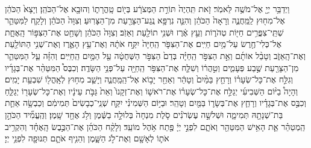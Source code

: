 \documentclass[twoside, openany, parskip=half, 11pt]{book}
\begin{document}
\begin{footnotesize}
\begin{multicols}{2}
\\
 וַיְדַבֵּ֥ר יְיָ֖ אֶל־מֹשֶׁ֥ה לֵּאמֹֽר׃ זֹ֤את תִּֽהְיֶה֙ תּוֹרַ֣ת הַמְּצֹרָ֔ע בְּי֖וֹם טָֽהֳרָת֑וֹ וְהוּבָ֖א אֶל־הַכֹּהֵֽן׃ וְיָצָא֙ הַכֹּהֵ֔ן אֶל־מִח֖וּץ לַֽמַּֽחֲנֶ֑ה וְרָאָה֙ הַכֹּהֵ֔ן וְהִנֵּ֛ה נִרְפָּ֥א נֶֽגַע־הַצָּרַ֖עַת מִן־הַצָּרֽוּעַ׃ וְצִוָּה֙ הַכֹּהֵ֔ן וְלָקַ֧ח לַמִּטַּהֵ֛ר שְׁתֵּֽי־צִפֳּרִ֥ים חַיּ֖וֹת טְהֹר֑וֹת וְעֵ֣ץ אֶ֔רֶז וּשְׁנִ֥י תוֹלַ֖עַת וְאֵזֹֽב׃ וְצִוָּה֙ הַכֹּהֵ֔ן וְשָׁחַ֖ט אֶת־הַצִּפּ֣וֹר הָֽאֶחָ֑ת אֶל־כְּלִי־חֶ֖רֶשׂ עַל־מַ֥יִם חַיִּֽים׃  אֶת־הַצִּפֹּ֤ר הַֽחַיָּה֙ יִקַּ֣ח אֹתָ֔הּ וְאֶת־עֵ֥ץ הָאֶ֛רֶז וְאֶת־שְׁנִ֥י הַתּוֹלַ֖עַת וְאֶת־הָֽאֵזֹ֑ב וְטָבַ֨ל אוֹתָ֜ם וְאֵ֣ת הַצִּפֹּ֣ר הַֽחַיָּ֗ה בְּדַם֙ הַצִּפֹּ֣ר הַשְּׁחֻטָ֔ה עַ֖ל הַמַּ֥יִם הַֽחַיִּֽים׃ וְהִזָּ֗ה עַ֧ל הַמִּטַּהֵ֛ר מִן־הַצָּרַ֖עַת שֶׁ֣בַע פְּעָמִ֑ים וְטִ֣הֲר֔וֹ וְשִׁלַּ֛ח אֶת־הַצִּפֹּ֥ר הַֽחַיָּ֖ה עַל־פְּנֵ֥י הַשָּׂדֶֽה׃ וְכִבֶּס֩ הַמִּטַּהֵ֨ר אֶת־בְּגָדָ֜יו וְגִלַּ֣ח אֶת־כָּל־שְׂעָר֗וֹ וְרָחַ֤ץ בַּמַּ֨יִם֙ וְטָהֵ֔ר וְאַחַ֖ר יָב֣וֹא אֶל־הַֽמַּֽחֲנֶ֑ה וְיָשַׁ֛ב מִח֥וּץ לְאָֽהֳל֖וֹ שִׁבְעַ֥ת יָמִֽים׃ וְהָיָה֩ בַיּ֨וֹם הַשְּׁבִיעִ֜י יְגַלַּ֣ח אֶת־כָּל־שְׂעָר֗וֹ אֶת־רֹאשׁ֤וֹ וְאֶת־זְקָנוֹ֙ וְאֵת֙ גַּבֹּ֣ת עֵינָ֔יו וְאֶת־כָּל־שְׂעָר֖וֹ יְגַלֵּ֑חַ וְכִבֶּ֣ס אֶת־בְּגָדָ֗יו וְרָחַ֧ץ אֶת־בְּשָׂר֛וֹ בַּמַּ֖יִם וְטָהֵֽר׃  וּבַיּ֣וֹם הַשְּׁמִינִ֗י יִקַּ֤ח שְׁנֵֽי־כְבָשִׂים֙ תְּמִימִ֔ם וְכַבְשָׂ֥ה אַחַ֛ת בַּת־שְׁנָתָ֖הּ תְּמִימָ֑ה וּשְׁלשָׁ֣ה עֶשְׂרֹנִ֗ים סֹ֤לֶת מִנְחָה֙ בְּלוּלָ֣ה בַשֶּׁ֔מֶן וְלֹ֥ג אֶחָ֖ד שָֽׁמֶן׃ וְהֶֽעֱמִ֞יד הַכֹּהֵ֣ן הַֽמְטַהֵ֗ר אֵ֛ת הָאִ֥ישׁ הַמִּטַּהֵ֖ר וְאֹתָ֑ם לִפְנֵ֣י יְיָ֔ פֶּ֖תַח אֹ֥הֶל מוֹעֵֽד׃ וְלָקַ֨ח הַכֹּהֵ֜ן אֶת־הַכֶּ֣בֶשׂ הָֽאֶחָ֗ד וְהִקְרִ֥יב אֹת֛וֹ לְאָשָׁ֖ם וְאֶת־לֹ֣ג הַשָּׁ֑מֶן וְהֵנִ֥יף אֹתָ֛ם תְּנוּפָ֖ה לִפְנֵ֥י יְיָ׃


\end{multicols}
\end{footnotesize}
\end{document}
